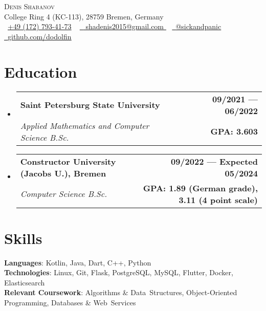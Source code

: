 \documentclass[a4,12pt]{article}
\makeatletter
\newcommand{\resumeSubheading}[4]{
  \vspace{-2pt}\item
    \begin{tabular*}{1.0\textwidth}[t]{l@{\extracolsep{\fill}}r}
      \textbf{#1} & \textbf{\small #2} \\
      \textit{\small#3} & \textbf{\small #4} \\
    \end{tabular*}\vspace{-7pt}
}
\newcommand{\resumeSubHeadingListStart}{\begin{itemize}[leftmargin=0.0in, label={}]}
\newcommand{\resumeSubHeadingListEnd}{\end{itemize}}
\makeatother
\begin{document}

\begin{center}
    {\Huge \scshape Denis Shabanov} \\ \vspace{1pt}
    College Ring 4 (KC-113), 28759 Bremen, Germany \\ \vspace{1pt}
    \small \raisebox{-0.1\height}\faPhone\
    \href{tel:+491727934173}{\underline{+49 (172) 793-41-73}} ~
    \href{
    mailto:shadenis2015@gmail.com
    }{\raisebox{-0.2\height}\faEnvelope\  \underline{
    shadenis2015@gmail.com
    }} ~ 
    \href{https://t.me/sickandpanic}{\raisebox{-0.2\height}\faSend\ \underline{@sickandpanic}}  ~
    \href{https://github.com/dodolfin}{\raisebox{-0.2\height}\faGithub\ \underline{github.com/dodolfin}}
    \vspace{-8pt}
\end{center}


\section{Education}
  \resumeSubHeadingListStart
    \resumeSubheading
      {Saint Petersburg State University}{09/2021 — 06/2022}
      {Applied Mathematics and Computer Science B.Sc.}{GPA: 3.603}
    \resumeSubheading
      {Constructor University (Jacobs U.), Bremen}{09/2022 — Expected 05/2024}
      {Computer Science B.Sc.}{GPA: 1.89 (German grade), 3.11 (4 point scale)}
  \resumeSubHeadingListEnd
  

\section{Skills}
 \begin{itemize}[leftmargin=0.15in, label={}]
    \small{\item{
     \textbf{Languages}{: Kotlin, Java, Dart, C++, Python} \\
     \textbf{Technologies}{: Linux, Git, Flask, PostgreSQL, MySQL, Flutter, Docker, Elasticsearch} \\
     \textbf{Relevant Coursework}{: Algorithms \& Data~Structures, Object-Oriented Programming, Databases \& Web~Services} \\
     }}
 \end{itemize}
 \vspace{-16pt}
\end{document}
